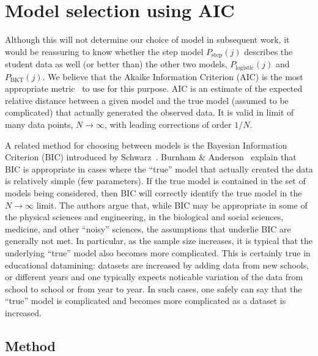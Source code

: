 \documentclass{acmlarge-edm}
\begin{document}
\section{Model selection using AIC}
\label{model-selection}

Although this will not determine our choice of model in subsequent
work, it would be reassuring to know whether the step model
$P_\mathrm{step}(j)$ describes the student data as well (or better
than) the other two models, $P_\mathrm{logistic}(j)$ and
$P_\mathrm{BKT}(j)$.  We believe that the Akaike Information Criterion
(AIC) is the most appropriate
metric~\cite{akaike_new_1974,burnham_model_2002} to use for this
purpose.  AIC is an estimate of the expected relative distance 
between a given model and the true model (assumed to be complicated) 
that actually generated the observed data.  It is valid in limit of 
many data points, $N\to\infty$, with leading corrections of order $1/N$.

A related method for choosing between models is the Bayesian Information
Criterion (BIC) introduced by Schwarz~\citeyear{schwarz_estimating_1978}.
Burnham \& Anderson~\citeyear[Sections~6.3 \& 6.4]{burnham_model_2002} explain that 
BIC is appropriate in cases where the ``true'' model that actually
created the data is relatively simple (few parameters).  If the true
model is contained in the set of  models being considered, then
BIC will correctly identify the true model in the $N\to\infty$
limit.    The authors argue that, while BIC may be  appropriate
in some of the physical sciences and engineering, in the biological
and social sciences, medicine, and other ``noisy'' sciences, the assumptions that underlie
BIC are generally not met.  In particular, as the sample size increases, it is
typical that the underlying ``true'' model also becomes more complicated.
This is certainly true in educational datamining:  datasets are
increased by adding data from new schools, or different years and one
typically expects noticable variation of the data from school to
school or from year to year.  In such cases, one safely can say that
the ``true'' model is complicated and becomes more complicated as
a dataset is increased.



\subsection{Method}
\end{document}
